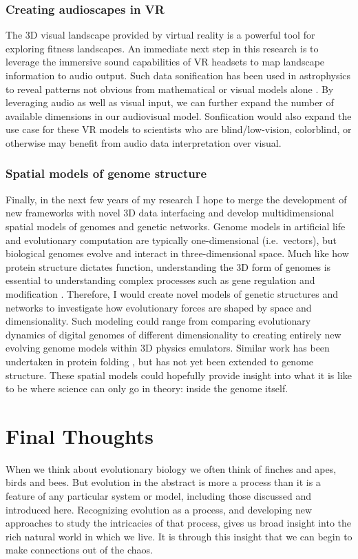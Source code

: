 \subsubsection{Creating audioscapes in VR}

The 3D visual landscape provided by virtual reality is a powerful tool for exploring fitness landscapes. 
An immediate next step in this research is to leverage the immersive sound capabilities of VR headsets to map landscape information to audio output. 
Such data sonification has been used in astrophysics to reveal patterns not obvious from mathematical or visual models alone \citep{gibney_how_2020}.
By leveraging audio as well as visual input, we can further expand the number of available dimensions in our audiovisual model.
Sonfiication would also expand the use case for these VR models to scientists who are blind/low-vision, colorblind, or otherwise may benefit from audio data interpretation over visual.

\subsubsection{Spatial models of genome structure}

Finally, in the next few years of my research I hope to merge the development of new frameworks with novel 3D data interfacing and develop multidimensional spatial models of genomes and genetic networks.
Genome models in artificial life and evolutionary computation are typically one-dimensional (i.e.~vectors), but biological genomes evolve and interact in three-dimensional space. 
Much like how protein structure dictates function, understanding the 3D form of genomes is essential to understanding complex processes such as gene regulation and modification \citep{mendizabal_epigenetics_2014, sotelo-silveira_entering_2018}.
Therefore, I would create novel models of genetic structures and networks to investigate how evolutionary forces are shaped by space and dimensionality.
Such modeling could range from comparing evolutionary dynamics of digital genomes of different dimensionality to creating entirely new evolving genome models within 3D physics emulators. Similar work has been undertaken in protein folding \cite{finkelstein_physics_2004}, but has not yet been extended to genome structure. 
These spatial models could hopefully provide insight into what it is like to be where science can only go in theory: inside the genome itself.

\section{Final Thoughts}

When we think about evolutionary biology we often think of finches and apes, birds and bees. But evolution in the abstract is more a process than it is a feature of any particular system or model, including those discussed and introduced here. Recognizing evolution as a process, and developing new approaches to study the intricacies of that process, gives us broad insight into the rich natural world in which we live. It is through this insight that we can begin to make connections out of the chaos.